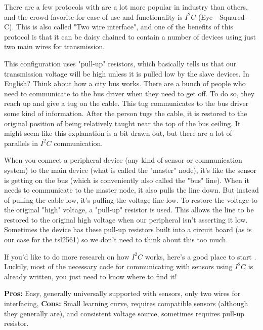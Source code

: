 \documentclass[a4paper]{article}
\begin{document}
There are a few protocols with are a lot more popular in industry than others, and the crowd favorite for ease of use and functionality is $I^2C$ (Eye - Squared - C). This is also called "Two wire interface", and one of the benefits of this protocol is that it can be daisy chained to contain a number of devices using just two main wires for transmission.

This configuration uses "pull-up" resistors, which basically tells us that our transmission voltage will be high unless it is pulled low by the slave devices. In English? Think about how a city bus works. There are a bunch of people who need to communicate to the bus driver when they need to get off. To do so, they reach up and give a tug on the cable. This tug communicates to the bus driver some kind of information. After the person tugs the cable, it is restored to the original position of being relatively taught near the top of the bus ceiling. It might seem like this explanation is a bit drawn out, but there are a lot of parallels in $I^2C$ communication.

When you connect a peripheral device (any kind of sensor or communication system) to the main device (what is called the "master" node), it's like the sensor is getting on the bus (which is conveniently also called the "bus" line). When it needs to communicate to the master node, it also pulls the line down. But instead of pulling the cable low, it's pulling the voltage line low. To restore the voltage to the original "high" voltage, a "pull-up" resistor is used. This allows the line to be restored to the original high voltage when our peripheral isn't asserting it low. Sometimes the device has these pull-up resistors built into a circuit board (as is our case for the tsl2561) so we don't need to think about this too much.

If you'd like to do more research on how $I^2C$ works, here's a good place to start \cite{i2c}. Luckily, most of the necessary code for communicating with sensors using $I^2C$ is already written, you just need to know where to find it!

\newline \noindent
\textbf{Pros:} Easy, generally universally supported with sensors, only two wires for interfacing,
\newline \noindent
\textbf{Cons:} Small learning curve, requires compatible sensors (although they generally are), and consistent voltage source, sometimes requires pull-up resistor.
\end{document}
